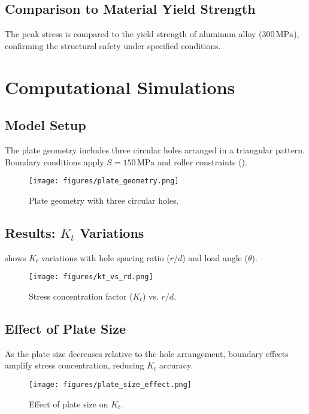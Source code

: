 \documentclass[a4paper,11pt]{article}
\begin{document}
\subsection{Comparison to Material Yield Strength}
The peak stress is compared to the yield strength of aluminum alloy (\(300 \, \text{MPa}\)), confirming the structural safety under specified conditions.

\newpage

\section{Computational Simulations}
\subsection{Model Setup}
The plate geometry includes three circular holes arranged in a triangular pattern. Boundary conditions apply \(S = 150 \, \text{MPa}\) and roller constraints ().

\begin{figure}[H]
    \centering
    \texttt{[image: figures/plate\_geometry.png]}
    \caption{Plate geometry with three circular holes.}
    \label{fig:plate_geometry}
\end{figure}

\subsection{Results: \(K_t\) Variations}
 shows \(K_t\) variations with hole spacing ratio (\(r/d\)) and load angle (\(\theta\)).

\begin{figure}[H]
    \centering
    \texttt{[image: figures/kt\_vs\_rd.png]}
    \caption{Stress concentration factor (\(K_t\)) vs. \(r/d\).}
    \label{fig:kt_vs_rd}
\end{figure}

\newpage

\subsection{Effect of Plate Size}
As the plate size decreases relative to the hole arrangement, boundary effects amplify stress concentration, reducing \(K_t\) accuracy.

\begin{figure}[H]
    \centering
    \texttt{[image: figures/plate\_size\_effect.png]}
    \caption{Effect of plate size on \(K_t\).}
    \label{fig:plate_size_effect}
\end{figure}
\end{document}
